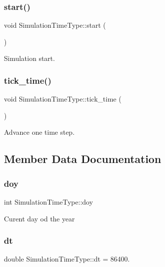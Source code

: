 \subsubsection{\texorpdfstring{start()}{start()}}
{\footnotesize\ttfamily void Simulation\+Time\+Type\+::start (\begin{DoxyParamCaption}{ }\end{DoxyParamCaption})}

Simulation start. \mbox{\label{class_simulation_time_type_a5a0171330f407e1293c6fdf489055278}} 
\subsubsection{\texorpdfstring{tick\+\_\+time()}{tick\_time()}}
{\footnotesize\ttfamily void Simulation\+Time\+Type\+::tick\+\_\+time (\begin{DoxyParamCaption}{ }\end{DoxyParamCaption})}

Advance one time step. 

\subsection{Member Data Documentation}
\mbox{\label{class_simulation_time_type_a23da42b319f90f8ce0ea36f8c76946a5}} 
\subsubsection{\texorpdfstring{doy}{doy}}
{\footnotesize\ttfamily int Simulation\+Time\+Type\+::doy}

Curent day od the year \mbox{\label{class_simulation_time_type_a47d3b95a336cd5be9672c48237301d4f}} 
\subsubsection{\texorpdfstring{dt}{dt}}
{\footnotesize\ttfamily double Simulation\+Time\+Type\+::dt = 86400.}

